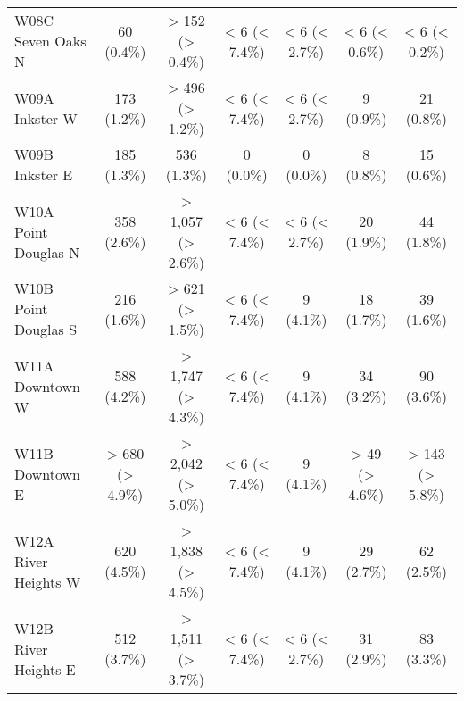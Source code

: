 \documentclass{article}
\begin{document}
\begin{table}[htbp]
\begin{longtable}{l*{6}{c}}
  W08C Seven Oaks N                                     &            60 (0.4\%)           &         > 152 (> 0.4\%)         &          < 6 (< 7.4\%)          &          < 6 (< 2.7\%)          &          < 6 (< 0.6\%)          &          < 6 (< 0.2\%)          \\
  W09A Inkster W                                        &           173 (1.2\%)           &         > 496 (> 1.2\%)         &          < 6 (< 7.4\%)          &          < 6 (< 2.7\%)          &            9 (0.9\%)            &            21 (0.8\%)           \\
  W09B Inkster E                                        &           185 (1.3\%)           &           536 (1.3\%)           &            0 (0.0\%)            &            0 (0.0\%)            &            8 (0.8\%)            &            15 (0.6\%)           \\
  W10A Point Douglas N                                  &           358 (2.6\%)           &        > 1,057 (> 2.6\%)        &          < 6 (< 7.4\%)          &          < 6 (< 2.7\%)          &            20 (1.9\%)           &            44 (1.8\%)           \\
  W10B Point Douglas S                                  &           216 (1.6\%)           &         > 621 (> 1.5\%)         &          < 6 (< 7.4\%)          &            9 (4.1\%)            &            18 (1.7\%)           &            39 (1.6\%)           \\
  W11A Downtown W                                       &           588 (4.2\%)           &        > 1,747 (> 4.3\%)        &          < 6 (< 7.4\%)          &            9 (4.1\%)            &            34 (3.2\%)           &            90 (3.6\%)           \\
  W11B Downtown E                                       &         > 680 (> 4.9\%)         &        > 2,042 (> 5.0\%)        &          < 6 (< 7.4\%)          &            9 (4.1\%)            &          > 49 (> 4.6\%)         &         > 143 (> 5.8\%)         \\
  W12A River Heights W                                  &           620 (4.5\%)           &        > 1,838 (> 4.5\%)        &          < 6 (< 7.4\%)          &            9 (4.1\%)            &            29 (2.7\%)           &            62 (2.5\%)           \\
  W12B River Heights E                                  &           512 (3.7\%)           &        > 1,511 (> 3.7\%)        &          < 6 (< 7.4\%)          &          < 6 (< 2.7\%)          &            31 (2.9\%)           &            83 (3.3\%)           \\

\end{longtable}
\end{table}
\end{document}
